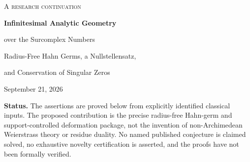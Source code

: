 \documentclass[11pt,letterpaper]{article}
\theoremstyle{definition}
\theoremstyle{remark}
\newcommand{\C}{\mathbb C}
\newcommand{\No}{\mathbf{No}}
\newcommand{\A}{\mathscr A}
\numberwithin{equation}{section}
\begin{document}
\begin{titlepage}
\centering
\vspace*{0.8cm}
{\Large\scshape A research continuation\par}
\vspace{0.7cm}
{\Huge\bfseries Infinitesimal Analytic Geometry\par}
\vspace{0.35cm}
{\LARGE over the Surcomplex Numbers\par}
\vspace{0.75cm}
{\Large Radius-Free Hahn Germs, a Nullstellensatz,\par and Conservation of Singular Zeros\par}
\vspace{0.65cm}
{\large September 21, 2026\par}
\vspace{0.45cm}
\begin{minipage}{0.93\textwidth}
\begin{abstract}
We develop several-variable analytic geometry on an infinitesimal surcomplex neighborhood. For a nonzero divisible set-sized ordered subgroup $\Gamma\subset\No$, put $K=\C((t^\Gamma))$ and
\[
 \A_n=\C\{z_1,\ldots,z_n\}((t^\Gamma)).
\]
Each Hahn coefficient is a convergent complex germ, but the coefficients need not share any ordinary radius of convergence. We prove division and preparation with explicit support bounds, and show that $\A_n$ is a regular Noetherian Jacobson domain of dimension $n$. Its maximal ideals are exactly evaluation ideals at infinitesimal $K$-points; consequently it satisfies a strong Nullstellensatz on that infinitesimal neighborhood.

The principal deformation theorem treats an arbitrary isolated analytic complete intersection, not merely a simple zero or a triangular system. Every perturbation with strictly positive Hahn support preserves its finite algebraic length. An explicit normal-form construction and a strongly summable multidimensional residue give a perfect pairing, a trace--Jacobian identity, and exact conservation of zero multiplicities. Enlarging the surreal workspace creates no additional zeros. A quantitative Hensel--Rouch\'e theorem then gives a root-by-root correspondence under a sharp inverse-Jacobian valuation bound. A four-point two-variable example exhibits splitting across different valuation ranks and cancellation of infinite individual residues.
\end{abstract}
\end{minipage}
\vfill
\begin{minipage}{0.93\textwidth}\small
\textbf{Status.} The assertions are proved below from explicitly identified classical inputs. The proposed contribution is the precise radius-free Hahn-germ and support-controlled deformation package, not the invention of non-Archimedean Weierstrass theory or residue duality. No named published conjecture is claimed solved, no exhaustive novelty certification is asserted, and the proofs have not been formally verified.
\end{minipage}
\end{titlepage}
\tableofcontents
\newpage
\end{document}
